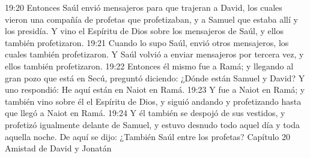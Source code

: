 19:20 Entonces Saúl envió mensajeros para que trajeran a David, los cuales vieron una compañía de profetas que profetizaban, y a Samuel que estaba allí y los presidía. Y vino el Espíritu de Dios sobre los mensajeros de Saúl, y ellos también profetizaron.  
19:21 Cuando lo supo Saúl, envió otros mensajeros, los cuales también profetizaron. Y Saúl volvió a enviar mensajeros por tercera vez, y ellos también profetizaron.  
19:22 Entonces él mismo fue a Ramá; y llegando al gran pozo que está en Secú, preguntó diciendo: ¿Dónde están Samuel y David? Y uno respondió: He aquí están en Naiot en Ramá.  
19:23 Y fue a Naiot en Ramá; y también vino sobre él el Espíritu de Dios, y siguió andando y profetizando hasta que llegó a Naiot en Ramá.  
19:24 Y él también se despojó de sus vestidos, y profetizó igualmente delante de Samuel, y estuvo desnudo todo aquel día y toda aquella noche. De aquí se dijo: ¿También Saúl entre los profetas? 
Capítulo 20
Amistad de David y Jonatán  


